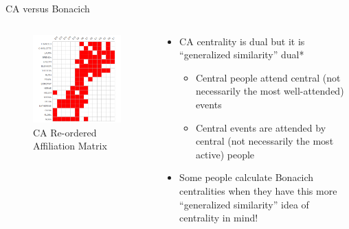 \documentclass[
  ignorenonframetext,
]{beamer}
\providecommand{\tightlist}{%
  \setlength{\itemsep}{0pt}\setlength{\parskip}{0pt}}\usepackage{longtable,booktabs,array}
\begin{document}
\begin{frame}{CA versus Bonacich}
\protect\hypertarget{ca-versus-bonacich-15}{}
\begin{columns}[T]
\begin{column}{0.5\textwidth}
\begin{figure}

{\centering \includegraphics{Plots/ca-reord.png}

}

\caption{CA Re-ordered Affiliation Matrix}

\end{figure}
\end{column}

\begin{column}{0.5\textwidth}
\begin{itemize}
\tightlist
\item
  CA centrality is dual but it is ``generalized similarity'' dual*

  \begin{itemize}
  \tightlist
  \item
    Central people attend central (not necessarily the most
    well-attended) events
  \item
    Central events are attended by central (not necessarily the most
    active) people
  \end{itemize}
\item
  Some people calculate Bonacich centralities when they have this more
  ``generalized similarity'' idea of centrality in mind!


\end{itemize}
\end{column}
\end{columns}
\end{frame}
\end{document}
